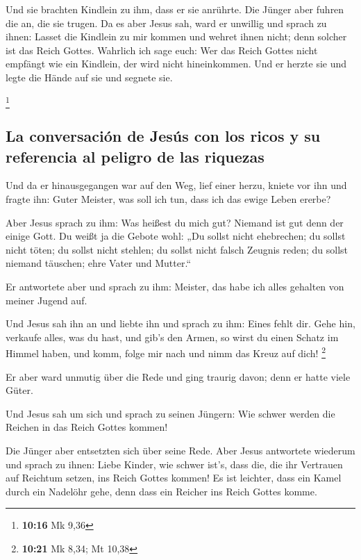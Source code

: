  Und sie brachten Kindlein zu ihm, dass er sie anrührte.
Die Jünger aber fuhren die an, die sie trugen.  Da es
aber Jesus sah, ward er unwillig und sprach zu ihnen: Lasset die
Kindlein zu mir kommen und wehret ihnen nicht; denn solcher ist das
Reich Gottes.  Wahrlich ich sage euch: Wer das Reich
Gottes nicht empfängt wie ein Kindlein, der wird nicht hineinkommen.
 Und er herzte sie und legte die Hände auf sie und
segnete sie.

\footnote{\textbf{10:16} Mk 9,36}

\hypertarget{la-conversaciuxf3n-de-jesuxfas-con-los-ricos-y-su-referencia-al-peligro-de-las-riquezas}{%
\subsection{La conversación de Jesús con los ricos y su referencia al
peligro de las
riquezas}\label{la-conversaciuxf3n-de-jesuxfas-con-los-ricos-y-su-referencia-al-peligro-de-las-riquezas}}

 Und da er hinausgegangen war auf den Weg, lief einer
herzu, kniete vor ihn und fragte ihn: Guter Meister, was soll ich tun,
dass ich das ewige Leben ererbe?

 Aber Jesus sprach zu ihm: Was heißest du mich gut?
Niemand ist gut denn der einige Gott.  Du weißt ja die
Gebote wohl: „Du sollst nicht ehebrechen; du sollst nicht töten; du
sollst nicht stehlen; du sollst nicht falsch Zeugnis reden; du sollst
niemand täuschen; ehre Vater und Mutter.``

 Er antwortete aber und sprach zu ihm: Meister, das habe
ich alles gehalten von meiner Jugend auf.

 Und Jesus sah ihn an und liebte ihn und sprach zu ihm:
Eines fehlt dir. Gehe hin, verkaufe alles, was du hast, und gib's den
Armen, so wirst du einen Schatz im Himmel haben, und komm, folge mir
nach und nimm das Kreuz auf dich! \footnote{\textbf{10:21} Mk 8,34; Mt
  10,38}

 Er aber ward unmutig über die Rede und ging traurig
davon; denn er hatte viele Güter.

 Und Jesus sah um sich und sprach zu seinen Jüngern: Wie
schwer werden die Reichen in das Reich Gottes kommen!

 Die Jünger aber entsetzten sich über seine Rede. Aber
Jesus antwortete wiederum und sprach zu ihnen: Liebe Kinder, wie schwer
ist's, dass die, die ihr Vertrauen auf Reichtum setzen, ins Reich Gottes
kommen!  Es ist leichter, dass ein Kamel durch ein
Nadelöhr gehe, denn dass ein Reicher ins Reich Gottes komme.

